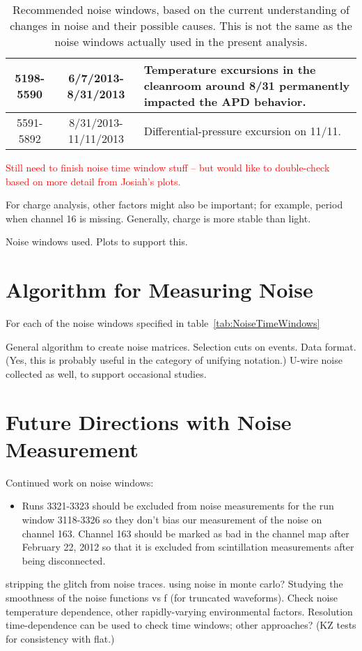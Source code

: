 \begin{table}
\begin{singlespace}
\begin{center}
\begin{tabular}{|c|c|p{}|}
5198-5590 & 6/7/2013-8/31/2013 & Temperature excursions in the cleanroom around 8/31 permanently impacted the APD behavior. \\\hline
5591-5892 & 8/31/2013-11/11/2013 & Differential-pressure excursion on 11/11. \\\hline
\end{tabular}
\end{center}
\end{singlespace}
\caption{Recommended noise windows, based on the current understanding of changes in noise and their possible causes.  This is not the same as the noise windows actually used in the present analysis.}
\label{tab:NoiseWindowsRecommendedForFuture}
\end{table}

\textcolor{red}{Still need to finish noise time window stuff -- but would like to double-check based on more detail from Josiah's plots.}


For charge analysis, other factors might also be important; for example, period when channel 16 is missing.  Generally, charge is more stable than light.

Noise windows used.
Plots to support this.

\section{Algorithm for Measuring Noise}\label{sec:NoiseCorrelationsImplementation}

For each of the noise windows specified in table~\ref{tab:NoiseTimeWindows}

General algorithm to create noise matrices.
Selection cuts on events.
Data format.  (Yes, this is probably useful in the category of unifying notation.)
U-wire noise collected as well, to support occasional studies.

\section{Future Directions with Noise Measurement}\label{sec:NoiseCorrelationsFuture}

Continued work on noise windows:
\begin{itemize}
\item Runs 3321-3323 should be excluded from noise measurements for the run window 3118-3326 so they don't bias our measurement of the noise on channel 163.  Channel 163 should be marked as bad in the channel map after February 22, 2012 so that it is excluded from scintillation measurements after being disconnected.
\end{itemize}

stripping the glitch from noise traces.
using noise in monte carlo?
Studying the smoothness of the noise functions vs f (for truncated waveforms).
Check noise temperature dependence, other rapidly-varying environmental factors.
Resolution time-dependence can be used to check time windows; other approaches?  (KZ tests for consistency with flat.)
